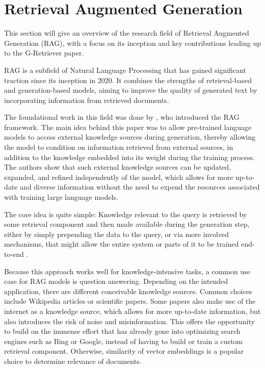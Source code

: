 \section{Retrieval Augmented Generation}

This section will give an overview of the research field of Retrieval Augmented Generation (RAG), with a focus on its inception and key contributions leading up to the G-Retriever paper.

RAG is a subfield of Natural Language Processing that has gained significant traction since its inception in 2020.
It combines the strengths of retrieval-based and generation-based models, aiming to improve the quality of generated text by incorporating information from retrieved documents.

The foundational work in this field was done by \cite{rag}, who introduced the RAG framework.
The main idea behind this paper was to allow pre-trained language models to access external knowledge sources during generation, thereby allowing the model to condition on information retrieved from external sources, in addition to  the knowledge embedded into its weight during the training process.
The authors show that such external knowledge sources can be updated, expanded, and refined independently of the model, which allows for more up-to-date and diverse information without the need to expend the resources associated with training large language models.


The core idea is quite simple: Knowledge relevant to the query is retrieved by some retrieval component and then made available during the generation step, either by simply prepending the data to the query, or via more involved mechanisms, that might allow the entire system or parts of it to be trained end-to-end \cite{in-context}.

Because this approach works well for knowledge-intensive tasks, a common use case for RAG models is question answering.
Depending on the intended application, there are different conceivable knowledge sources.
Common choices include Wikipedia articles or scientific papers.
Some papers also make use of the internet as a knowledge source, which allows for more up-to-date information, but also introduces the risk of noise and misinformation.
This offers the opportunity to build on the immense effort that has already gone into optimizing search engines such as Bing or Google, instead of having to build or train a custom retrieval component.
Otherwise, similarity of vector embeddings is a popular choice to determine relevance of documents.

